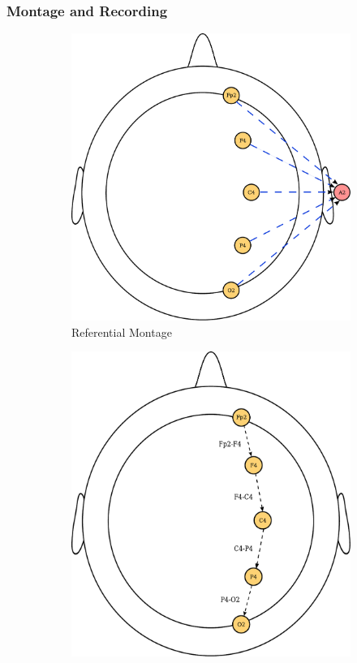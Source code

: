 \documentclass[12pt]{article}
\newcommand\mysubsubsection[1]{\subsubsection{#1}}
\numberwithin{equation}{section}
\numberwithin{figure}{section}
\numberwithin{table}{section}
\begin{document}
\mysubsubsection{Montage and Recording}\label{seq:eeg_recording}
\begin{figure}
    \centering
    \begin{subfigure}{.5\textwidth}
        \centering
        \includegraphics[scale=0.4]{images/unipolar_eeg}
        \caption{Referential Montage}
        \label{fig:referential_eeg}
    \end{subfigure}%
    \begin{subfigure}{.5\textwidth}
        \centering
        \includegraphics[scale=0.4]{images/bipolar_eeg}

\end{subfigure}
\end{figure}
\end{document}

